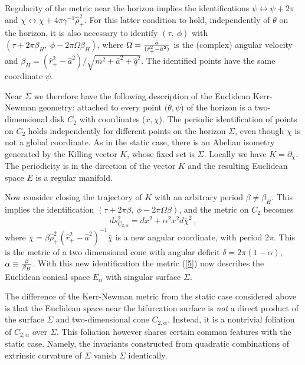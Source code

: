 \documentclass[12pt]{article}
\begin{document}
Regularity of the metric near the horizon implies the identifications
$\psi \leftrightarrow \psi +2\pi$ 
and  $\chi  \leftrightarrow \chi+4\pi\gamma^{-1}\hat{\rho}^2_+$.
For this latter condition to 
hold, independently of $\theta$ on the horizon, 
it is also necessary to
identify $(\tau,~\phi )$
with $(\tau+2\pi \beta_H,~\phi-2\pi \Omega \beta_H)$, 
where $\Omega={\hat{a} \over(\hat{r}^2_+- \hat{a}^2)}$ is the
(complex) angular velocity and $\beta_H={(\hat{r}_+^2-\hat{a}^2)/ 
\sqrt{m^2+\hat{a}^2+\hat{q}^2}}$. 
The identified points have the same coordinate $\psi$.


Near $\Sigma$ we therefore have the following description
of the Euclidean  Kerr-Newman geometry:
attached to every point $(\theta, \psi$) 
of the horizon is a two-dimensional disk $C_2$ with coordinates
($x, \chi$). The periodic identification of points on $C_2$ 
holds independently for different points on the horizon $\Sigma$,
even though $\chi$ is not a global coordinate.
As in the static case, there is an Abelian 
isometry generated by the Killing vector $K$, whose fixed set is
$\Sigma$. Locally we have $K=\partial_\chi$.
The periodicity is in the direction of the vector $K$ and
the resulting Euclidean space $E$ is a regular manifold.

Now consider closing the trajectory of $K$ with an arbitrary period
$\beta\neq \beta_H$. This implies the identification
$(\tau+2\pi \beta,~\phi-2\pi \Omega \beta)$, and the metric on
$C_2$ becomes
\begin{equation}
ds^2_{C_{2,\alpha}}=dx^2+\alpha^2x^2d\bar{\chi}^2\, ,
\label{12}
\end{equation}
where $\chi=\beta \hat{\rho}^2_+ (\hat{r}_+^2-\hat{a}^2)^{-1}\bar{\chi}$ 
is a new angular coordinate, with period $2\pi$. This is
the metric of a two dimensional cone with angular deficit 
$\delta=2\pi (1-\alpha)$, $\alpha\equiv {\beta\over \beta_H}$.
With this new identification the metric (\ref{5}) now describes the 
Euclidean conical space $E_\alpha$ with singular surface $\Sigma$.

The difference of the Kerr-Newman metric from the static case considered
above is that the Euclidean space near the bifurcation surface  is {\it not} a direct product of the surface $\Sigma$ and two-dimensional  cone $C_{2,\alpha}$. Instead, it is a nontrivial foliation of $C_{2,\alpha}$ over $\Sigma$. This foliation however shares certain common features with
the static case. Namely, the invariants constructed from quadratic combinations of extrinsic curvature of $\Sigma$ vanish $\Sigma$ identically.
\end{document}
